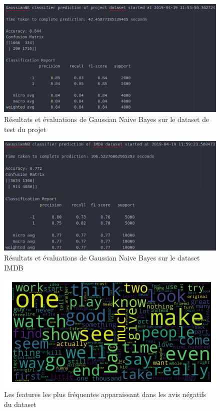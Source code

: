 \documentclass[12pt,a4paper]{report}
\theoremstyle{definition}
\begin{document}
\begin{appendices}
\begin{figure}[!ht]
  \centering
  \includegraphics[scale=0.5]{images/snapshots/predictions/gaussian_naive_bayes/project_dataset_results.png}
  \caption{Résultats et évaluations de Gaussian Naive Bayes sur le dataset de test du projet}
  \label{fig:gnb_project_dataset}
\end{figure}

\begin{figure}[!ht]
  \centering
  \includegraphics[scale=0.5]{images/snapshots/predictions/gaussian_naive_bayes/imdb_dataset_results.png}
  \caption{Résultats et évaluations de Gaussian Naive Bayes sur le dataset IMDB}
  \label{fig:gnb_imdb_dataset}
\end{figure}

\begin{figure}[!ht]
  \centering
  \includegraphics[scale=0.5]{images/wordcloud/negative_wordcloud.png}
  \caption{Les features les plus fréquentes apparaissant dans les avis négatifs du dataset}
  \label{fig:negative_wordcloud}
\end{figure}


\end{appendices}
\end{document}

